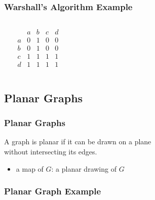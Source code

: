 \documentclass[dvipsnames]{beamer}
\begin{document}
\begin{frame}
  \frametitle{Warshall's Algorithm Example}

  \begin{example}
    \begin{columns}
      \begin{center}
      \end{center}

      \[
        \begin{array}{c|cccc}
              & a & b & c & d\\\hline
            a & 0 & 1 & 0 & 0\\
            b & 0 & 1 & 0 & 0\\
            c & 1 & 1 & 1 & 1\\
            d & 1 & 1 & 1 & 1
        \end{array}
      \]
    \end{columns}
  \end{example}
\end{frame}

\subsection{Planar Graphs}

\begin{frame}
  \frametitle{Planar Graphs}

  \begin{definition}
    A graph is \alert{planar} if it can be drawn on a plane\\
    without intersecting its edges.
  \end{definition}

  \begin{itemize}
    \item a \alert{map} of $G$: a planar drawing of $G$
  \end{itemize}
\end{frame}

\begin{frame}
  \frametitle{Planar Graph Example}

  \begin{example}[$K_4$]
    \begin{columns}
      \begin{center}
      \end{center}

      \begin{center}
      \end{center}
    \end{columns}
  \end{example}
\end{frame}
\end{document}
